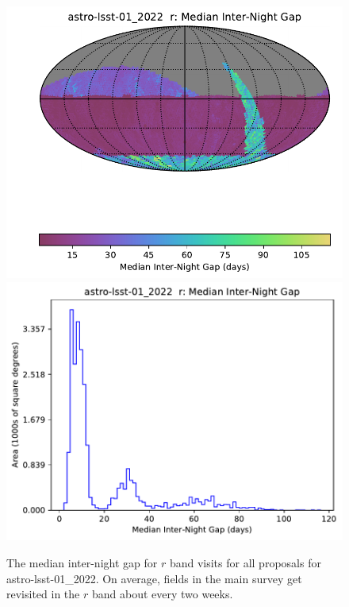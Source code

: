 \documentclass[DM,lsstdraft,authoryear,toc]{lsstdoc}
\begin{document}
\begin{figure}[h!]
\vskip -0.0in
\includegraphics[angle=0,width=0.49\hsize,clip]{figures/astro-lsst-01_2022_Median_Inter-Night_Gap_r_HEAL_SkyMap.pdf}
\includegraphics[angle=0,width=0.49\hsize,clip]{figures/astro-lsst-01_2022_Median_Inter-Night_Gap_r_HEAL_Histogram.pdf}
\vskip -0.1in
\caption{The median inter-night gap for $r$ band visits for all proposals for astro-lsst-01\_2022.
On average, fields in the main survey get revisited in the $r$ band about every two weeks.}
\label{fig:baseline_Gapr}
\end{figure}
\end{document}
